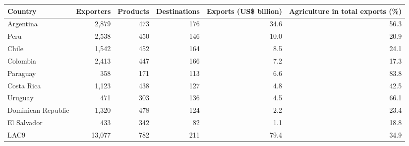 \begin{tabular}{lrrrrr}
\toprule
Country & Exporters & Products & Destinations & Exports (US\$ billion) & Agriculture in total exports (\%) \\
\midrule
Argentina & 2,879 & 473 & 176 & 34.6 & 56.3 \\
Peru & 2,538 & 450 & 146 & 10.0 & 20.9 \\
Chile & 1,542 & 452 & 164 & 8.5 & 24.1 \\
Colombia & 2,413 & 447 & 166 & 7.2 & 17.3 \\
Paraguay & 358 & 171 & 113 & 6.6 & 83.8 \\
Costa Rica & 1,123 & 438 & 127 & 4.8 & 42.5 \\
Uruguay & 471 & 303 & 136 & 4.5 & 66.1 \\
Dominican Republic & 1,320 & 478 & 124 & 2.2 & 23.4 \\
El Salvador & 433 & 342 & 82 & 1.1 & 18.8 \\
\midrule
LAC9 & 13,077 & 782 & 211 & 79.4 & 34.9 \\
\bottomrule
\end{tabular}
